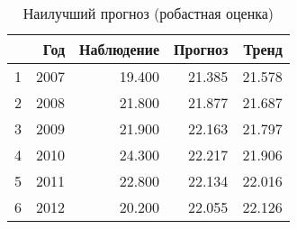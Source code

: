 \begin{table}[ht]
\centering
\begin{tabular}{rrrrr}
  \hline
 & Год & Наблюдение & Прогноз & Тренд \\ 
  \hline
1 & 2007 & 19.400 & 21.385 & 21.578 \\ 
  2 & 2008 & 21.800 & 21.877 & 21.687 \\ 
  3 & 2009 & 21.900 & 22.163 & 21.797 \\ 
  4 & 2010 & 24.300 & 22.217 & 21.906 \\ 
  5 & 2011 & 22.800 & 22.134 & 22.016 \\ 
  6 & 2012 & 20.200 & 22.055 & 22.126 \\ 
   \hline
\end{tabular}
\caption{Наилучший прогноз (робастная оценка)} 
\label{table:robust-best-prediction}
\end{table}
